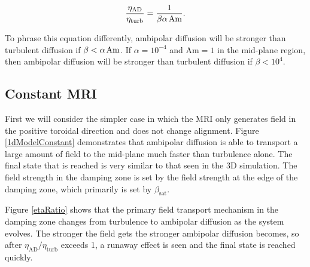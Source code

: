 \begin{equation}
\frac{\eta_{\text{AD}}}{\eta_{\text{turb}}} = \frac{1}{\beta \alpha \hspace{0.5mm} \text{Am}}.
\label{eqEtaRatio}
\end{equation}

\noindent  To phrase this equation differently, ambipolar diffusion will be stronger than turbulent diffusion if $\beta < \alpha \hspace{0.5mm} \text{Am}$.  If $\alpha=10^{-4}$ and $\text{Am}=1$ in the mid-plane region, then ambipolar diffusion will be stronger than turbulent diffusion if $\beta<10^4$.


\subsection{Constant MRI}
First we will consider the simpler case in which the MRI only generates field in the positive toroidal direction and does not change alignment.  Figure \ref{1dModelConstant} demonstrates that ambipolar diffusion is able to transport a large amount of field to the mid-plane much faster than turbulence alone.  The final state that is reached is very similar to that seen in the 3D simulation.  The field strength in the damping zone is set by the field strength at the edge of the damping zone, which primarily is set by $\beta_\text{sat}$.  


Figure \ref{etaRatio} shows that the primary field transport mechanism in the damping zone changes from turbulence to ambipolar diffusion as the system evolves.  The stronger the field gets the stronger ambipolar diffusion becomes, so after $\eta_\text{AD}/\eta_\text{turb}$ exceeds 1, a runaway effect is seen and the final state is reached quickly.  


